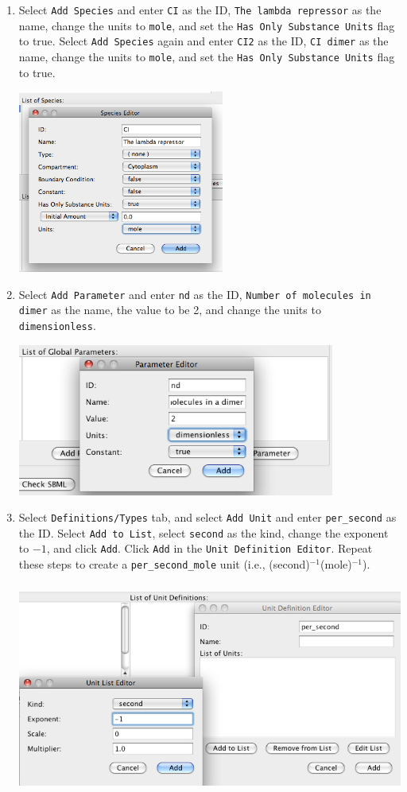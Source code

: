 \documentclass[titlepage,11pt]{article}
\begin{document}
\begin{enumerate}
\item Select {\tt Add Species} and enter {\tt CI} as the ID, 
{\tt The lambda repressor} as the name, change the units 
to {\tt mole}, and set the {\tt Has Only Substance Units} flag to
true.  Select {\tt Add Species} again and enter {\tt CI2} as the ID,
{\tt CI dimer} as the name, change the units to {\tt mole}, and set the
{\tt Has Only Substance Units} flag to true. 

\includegraphics[height=60mm]{screenshots/species}

\item Select {\tt Add Parameter} and enter {\tt nd} as the ID,
      {\tt Number of molecules in dimer} as the name, the value to be 2,
      and change the units to {\tt dimensionless}.

\includegraphics[height=50mm]{screenshots/parameter}

\item Select {\tt Definitions/Types} tab, and select {\tt Add Unit}
      and enter {\tt per\_second} as the ID.  Select {\tt Add to List}, 
      select {\tt second} as the kind, change the exponent to $-1$, 
      and click {\tt Add}.  Click {\tt Add} in the {\tt Unit Definition Editor}.
      Repeat these steps to create a {\tt per\_second\_mole} unit 
      (i.e., (second)$^{-1}$(mole)$^{-1}$).

\includegraphics[height=70mm]{screenshots/units}


\end{enumerate}
\end{document}
